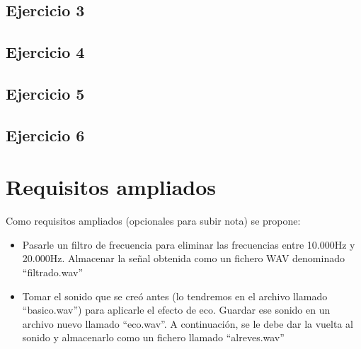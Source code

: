 \documentclass[a4paper]{article}
\begin{document}

\subsection{Ejercicio 3}\label{subsec:ej3}



\subsection{Ejercicio 4}\label{subsec:ej4}


\subsection{Ejercicio 5}\label{subsec:ej5}



\subsection{Ejercicio 6}\label{subsec:ej6}


\newpage
\section{Requisitos ampliados}
Como requisitos ampliados (opcionales para subir nota) se propone:
\begin{itemize}
    \item Pasarle un filtro de frecuencia para eliminar las frecuencias entre 10.000Hz y 20.000Hz. Almacenar la señal obtenida como un fichero WAV denominado ``filtrado.wav''  
    \item Tomar el sonido que se creó antes (lo tendremos en el archivo llamado ``basico.wav'') para aplicarle el efecto de eco. Guardar ese sonido en un archivo nuevo llamado ``eco.wav''. A continuación, se le debe dar la vuelta al sonido y almacenarlo como un fichero llamado ``alreves.wav''
\end{itemize}


\end{document}
